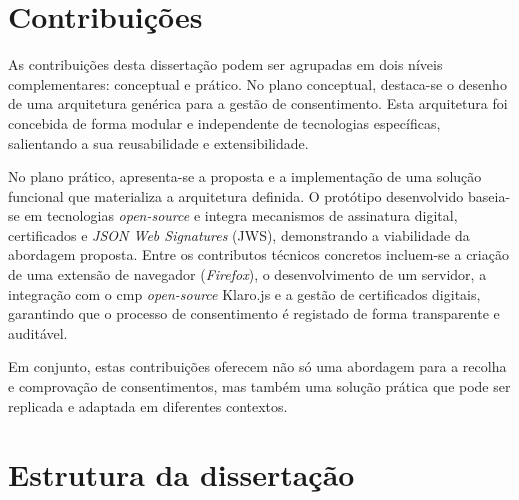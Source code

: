
\section{Contribuições}

As contribuições desta dissertação podem ser agrupadas em dois níveis complementares: conceptual e prático. 
No plano conceptual, destaca-se o desenho de uma arquitetura genérica para a gestão de consentimento. Esta arquitetura foi concebida de forma modular e independente de tecnologias específicas, salientando a sua reusabilidade e extensibilidade.

No plano prático, apresenta-se a proposta e a implementação de uma solução funcional que materializa a arquitetura definida. O protótipo desenvolvido baseia-se em tecnologias \textit{open-source} e integra mecanismos de assinatura digital, certificados e \textit{JSON Web Signatures} (JWS), demonstrando a viabilidade da abordagem proposta. Entre os contributos técnicos concretos incluem-se a criação de uma extensão de navegador (\textit{Firefox}), o desenvolvimento de um servidor, a integração com o \acrshort{cmp} \textit{open-source} Klaro.js e a gestão de certificados digitais, garantindo que o processo de consentimento é registado de forma transparente e auditável.

Em conjunto, estas contribuições oferecem não só uma abordagem para a recolha e comprovação de consentimentos, mas também uma solução prática que pode ser replicada e adaptada em diferentes contextos.

\section{Estrutura da dissertação}

